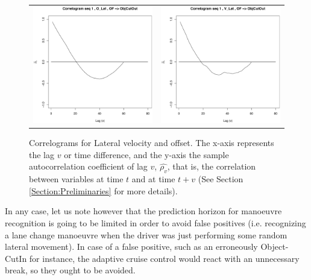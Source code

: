 \begin{figure}
  \centering
    \begin{tabular}{cc}
    \includegraphics[width=60mm]{figures/DaimlerCorrOBJ_R80Offs.pdf}&
    \includegraphics[width=60mm]{figures/DaimlerCorrOBJ_R80Vel.pdf}\\
  \end{tabular}
    \caption{\label{Figure:daimlerCorrel}Correlograms for Lateral velocity and offset. The x-axis represents the lag $v$ or time difference, and the y-axis the sample autocorrelation coefficient of lag $v$, $\hat{\rho_v}$, that is, the correlation between variables at time $t$ and at time $t+v$ (See Section \ref{Section:Preliminaries} for more details).}
\end{figure}

In any case, let us note however that the prediction horizon for manoeuvre recognition is going to be limited in order to avoid false positives (i.e. recognizing a lane change manoeuvre when the driver was just performing some random lateral movement).  In case of a false positive, such as an erroneously Object-CutIn for instance, the adaptive cruise control would react with an unnecessary break, so they ought to be avoided.

